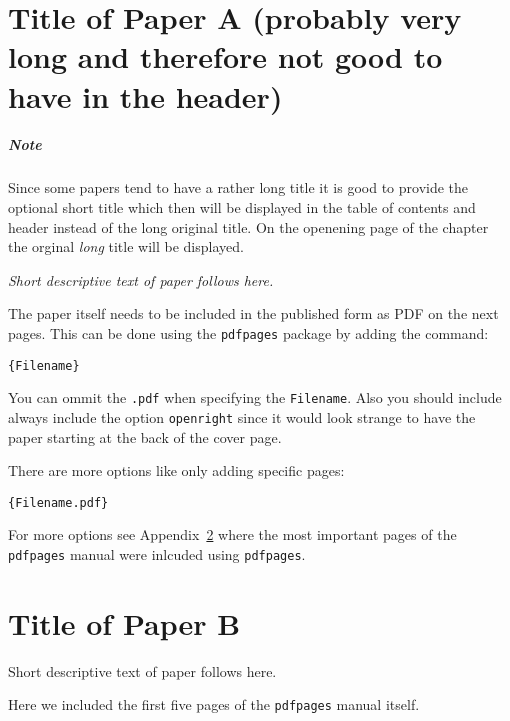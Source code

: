 \documentclass[%
    norsk,  %
]{USN-BSc}
\begin{document}


\chapter[Short Title of Paper A]{Title of Paper A (probably very long and therefore not good to have in the header)}
\label{paper-a}

\paragraph{Note}
Since some papers tend to have a rather long title it is good to provide the optional short title which then will be displayed in the table of contents and header instead of the long original title.
On the openening page of the chapter the orginal \emph{long} title will be displayed.\bigskip

\emph{Short descriptive text of paper follows here.}\bigskip

The paper itself needs to be included in the published form as PDF on the next pages.
This can be done using the \texttt{pdfpages} package by adding the command:

\begin{verbatim}
{Filename}
\end{verbatim}

You can ommit the \texttt{.pdf} when specifying the \texttt{Filename}. Also you should include always include the option \texttt{openright} since it would look strange to have the paper starting at the back of the cover page.

There are more options like only adding specific pages:
\begin{verbatim}
{Filename.pdf}
\end{verbatim}

For more options see Appendix~\ref{paper-b} where the most important pages of the \texttt{pdfpages} manual were inlcuded using \texttt{pdfpages}.




\chapter[Short Title of Paper B]{Title of Paper B}
\label{paper-b}
Short descriptive text of paper follows here.

Here we included the first five pages of the \texttt{pdfpages} manual itself.


\end{document}

